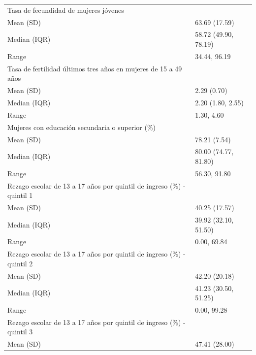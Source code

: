 \begin{table}
\begin{tabular}{ll}
\addlinespace
Tasa de fecundidad de mujeres jóvenes & \\
\hspace{1em}Mean (SD) & 63.69 (17.59)\\
\hspace{1em}Median (IQR) & 58.72 (49.90, 78.19)\\
\hspace{1em}Range & 34.44, 96.19\\
Tasa de fertilidad últimos tres años en mujeres de 15 a 49 años & \\
\addlinespace
\hspace{1em}Mean (SD) & 2.29 (0.70)\\
\hspace{1em}Median (IQR) & 2.20 (1.80, 2.55)\\
\hspace{1em}Range & 1.30, 4.60\\
Mujeres con educación secundaria o superior (\%) & \\
\hspace{1em}Mean (SD) & 78.21 (7.54)\\
\addlinespace
\hspace{1em}Median (IQR) & 80.00 (74.77, 81.80)\\
\hspace{1em}Range & 56.30, 91.80\\
Rezago escolar de 13 a 17 años por quintil de ingreso (\%) - quintil 1 & \\
\hspace{1em}Mean (SD) & 40.25 (17.57)\\
\hspace{1em}Median (IQR) & 39.92 (32.10, 51.50)\\
\addlinespace
\hspace{1em}Range & 0.00, 69.84\\
Rezago escolar de 13 a 17 años por quintil de ingreso (\%) - quintil 2 & \\
\hspace{1em}Mean (SD) & 42.20 (20.18)\\
\hspace{1em}Median (IQR) & 41.23 (30.50, 51.25)\\
\hspace{1em}Range & 0.00, 99.28\\
\addlinespace
Rezago escolar de 13 a 17 años por quintil de ingreso (\%) - quintil 3 & \\
\hspace{1em}Mean (SD) & 47.41 (28.00)\\

\end{tabular}
\end{table}
